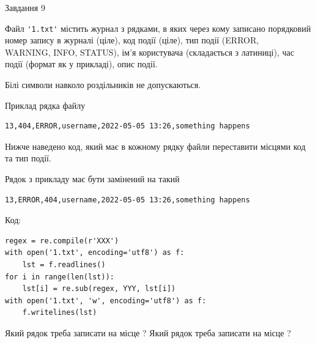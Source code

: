 \documentclass[12pt, ukrainian]{article}
\def\code#1{\Verb!#1!}
\begin{document}
{\begin{minipage}[t]{8.0cm}
\end{minipage}

               
{\begin{center}Завдання {9}\end{center}}
\vspace{-4mm}
Файл \code{'1.txt'} містить журнал з рядками, в яких через кому записано поряд\-ко\-вий номер запису в журналі (ціле), код події (ціле), тип події (ERROR,\\ WARNING, INFO, STATUS), ім'я користувача (складається з латиниці), час події (фор\-мат як у прикладі), опис події.

Білі символи навколо роздільників не допускаються.

Приклад рядка файлу



\begin{verbatim}
13,404,ERROR,username,2022-05-05 13:26,something happens
\end{verbatim}


Нижче наведено код, який має в кожному рядку файли переставити місцями код та тип події.

Рядок з прикладу має бути замінений на такий



\begin{verbatim}
13,ERROR,404,username,2022-05-05 13:26,something happens
\end{verbatim}




Код:



\begin{verbatim}
regex = re.compile(r'XXX')
with open('1.txt', encoding='utf8') as f:
    lst = f.readlines()
for i in range(len(lst)):
    lst[i] = re.sub(regex, YYY, lst[i])
with open('1.txt', 'w', encoding='utf8') as f:
    f.writelines(lst)
\end{verbatim}





Який рядок треба записати на місце  ?
Який рядок треба записати на місце  ?\par

}
\end{document}
